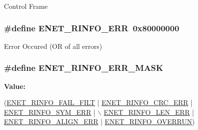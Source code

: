 Control Frame \hypertarget{group___e_n_e_t__17_x_x__40_x_x_ga15c3af4e6532d6de88860eb58046373a}{
\subsubsection[{E\+N\+E\+T\+\_\+\+R\+I\+N\+F\+O\+\_\+\+E\+R\+R}]{\setlength{\rightskip}{0pt plus 5cm}\#define E\+N\+E\+T\+\_\+\+R\+I\+N\+F\+O\+\_\+\+E\+R\+R~0x80000000}}\label{group___e_n_e_t__17_x_x__40_x_x_ga15c3af4e6532d6de88860eb58046373a}
Error Occured (O\+R of all errors) \hypertarget{group___e_n_e_t__17_x_x__40_x_x_ga07c87e5b7136302124084fee594d2d4a}{
\subsubsection[{E\+N\+E\+T\+\_\+\+R\+I\+N\+F\+O\+\_\+\+E\+R\+R\+\_\+\+M\+A\+S\+K}]{\setlength{\rightskip}{0pt plus 5cm}\#define E\+N\+E\+T\+\_\+\+R\+I\+N\+F\+O\+\_\+\+E\+R\+R\+\_\+\+M\+A\+S\+K}}\label{group___e_n_e_t__17_x_x__40_x_x_ga07c87e5b7136302124084fee594d2d4a}
{\bfseries Value\+:}
\begin{DoxyCode}
(\hyperlink{group___e_n_e_t__17_x_x__40_x_x_gaf3bb0d91c0511c58691d7189b551fe79}{ENET\_RINFO\_FAIL\_FILT} | \hyperlink{group___e_n_e_t__17_x_x__40_x_x_gad7ea1586c49309069d1d72a4ebe5aa89}{ENET\_RINFO\_CRC\_ERR}   | 
      \hyperlink{group___e_n_e_t__17_x_x__40_x_x_ga6c8d6c27397230acdab0d86aae333adb}{ENET\_RINFO\_SYM\_ERR} |  \hyperlink{group___e_n_e_t__17_x_x__40_x_x_ga9a8b65ee2091950cb6a66c2cf2f8be79}{\(\backslash\)}
\hyperlink{group___e_n_e_t__17_x_x__40_x_x_ga9a8b65ee2091950cb6a66c2cf2f8be79}{                                 ENET\_RINFO\_LEN\_ERR}   | 
      \hyperlink{group___e_n_e_t__17_x_x__40_x_x_ga4e4fcb457d4d1a16900c13f7a5a2db46}{ENET\_RINFO\_ALIGN\_ERR} | \hyperlink{group___e_n_e_t__17_x_x__40_x_x_gac8b350c71c904bca07eab6e4338303cf}{ENET\_RINFO\_OVERRUN})
\end{DoxyCode}
